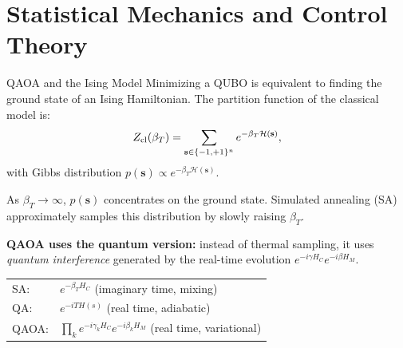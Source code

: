 \documentclass{beamer}
\begin{document}
\section{Statistical Mechanics and Control Theory}

\begin{frame}{QAOA and the Ising Model}
Minimizing a QUBO is equivalent to finding the ground state of an
Ising Hamiltonian. The partition function of the classical model is:
\[
Z_{\rm cl}(\beta_T) = \sum_{\mathbf{s}\in\{-1,+1\}^n}
e^{-\beta_T \mathcal{H}(\mathbf{s})},
\]
with Gibbs distribution $p(\mathbf{s})\propto e^{-\beta_T\mathcal{H}(\mathbf{s})}$.

\medskip

As $\beta_T\to\infty$, $p(\mathbf{s})$ concentrates on the ground
state. Simulated annealing (SA) approximately samples this
distribution by slowly raising $\beta_T$.

\medskip

\textbf{QAOA uses the quantum version:} instead of thermal sampling,
it uses \emph{quantum interference} generated by the real-time
evolution $e^{-i\gamma H_C}e^{-i\beta H_M}$.

\begin{center}
\begin{tabular}{ll}
\hline
SA: & $e^{-\beta_T H_C}$ (imaginary time, mixing) \\
QA: & $e^{-iT H(s)}$ (real time, adiabatic) \\
QAOA: & $\prod_k e^{-i\gamma_k H_C}e^{-i\beta_k H_M}$ (real time, variational) \\
\hline
\end{tabular}
\end{center}
\end{frame}

\end{document}
